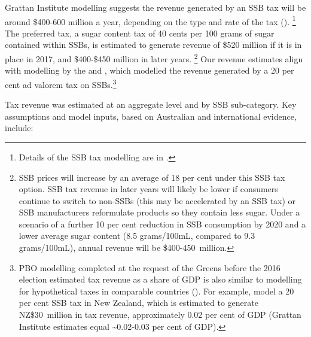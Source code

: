 \documentclass[embargoed]{grattan}
\begin{document}
Grattan Institute modelling suggests the revenue generated by an SSB tax will be around \$400-600 million a year, depending on the type and rate of the tax ().%
\footnote{Details of the SSB tax modelling are in .} The preferred tax, a sugar content tax of 40 cents per 100 grams of sugar contained within SSBs, is estimated to generate revenue of \$520 million if it is in place in 2017, and \$400-\$450 million in later years.%
\footnote{SSB prices will increase by an average of 18 per cent under this SSB tax option.
SSB tax revenue in later years will likely be lower if consumers continue to switch to non-SSBs (this may be accelerated by an SSB tax) or SSB manufacturers reformulate products so they contain less sugar.
Under a scenario of a further 10 per cent reduction in SSB consumption by 2020 and a lower average sugar content (8.5 grams/100mL, compared to 9.3 grams/100mL), annual revenue will be \$400-450~million.} Our revenue estimates align with modelling by the \textcite{Office2016PolicycostingAustralian} and \textcite{Veerman2016ImpactTaxSugar}, which modelled the revenue generated by a 20 per cent ad valorem tax on SSBs.\footnote{PBO modelling completed at the request of the Greens before the 2016 election estimated tax revenue as a share of GDP is also similar to modelling for hypothetical taxes in comparable countries (\textcites{Andreyeva2011Estimatingpotentialtaxes}{Briggs2013Overallincomespecific}). For example, \textcite{Mhurchu2007Nutritionlabelsclaims} model a 20 per cent SSB tax in New Zealand, which is estimated to generate NZ\$30~million in tax revenue, approximately 0.02 per cent of GDP (Grattan Institute estimates equal \textasciitilde{}0.02-0.03 per cent of GDP).}

Tax revenue was estimated at an aggregate level and by SSB sub-category.
Key assumptions and model inputs, based on Australian and international evidence, include:
\end{document}
